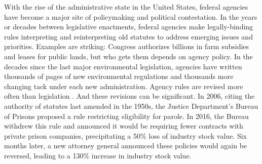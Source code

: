 





With the rise of the administrative state in the United States, federal agencies have become a major site of policymaking and political contestation. In the years or decades between legislative enactments, federal agencies make legally-binding rules interpreting and reinterpreting old statutes to address emerging issues and priorities. %
Examples are striking: %
Congress authorizes billions in farm subsidies and leases for public lands, but who gets them depends on agency policy. In the decades since the last major environmental legislation, agencies have written thousands of pages of new environmental regulations and thousands more changing tack under each new administration. Agency rules are revised more often than legislation \citep{Wagner2017DynamicRulemaking}.
 And these revisions can be significant. In 2006, citing the authority of statutes last amended in the 1950s, the Justice Department's Bureau of Prisons proposed a rule restricting eligibility for parole. In 2016, the Bureau withdrew this rule and announced it would be requiring fewer contracts with private prison companies, precipitating a 50\% loss of industry stock value. Six months later, a new attorney general announced these policies would again be reversed, leading to a 130\% increase in industry stock value. %
